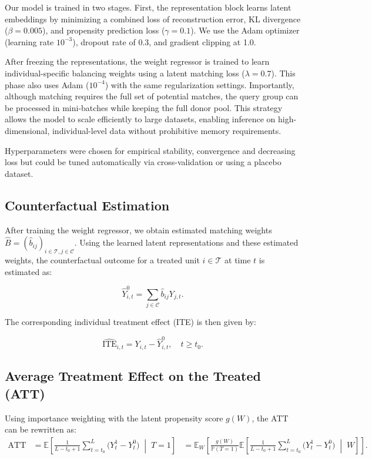 \documentclass[10pt]{article} %
\begin{document}
Our model is trained in two stages. First, the representation block learns latent embeddings by minimizing a combined loss of reconstruction error, KL divergence (\(\beta = 0.005\)), and propensity prediction loss (\(\gamma = 0.1\)). We use the Adam optimizer \cite{kingma2014adam} (learning rate \(10^{-3}\)), dropout rate of 0.3, and gradient clipping at 1.0.

After freezing the representations, the weight regressor is trained to learn individual-specific balancing weights using a latent matching loss (\(\lambda = 0.7\)). This phase also uses Adam (\(10^{-4}\)) with the same regularization settings. Importantly, although matching requires the full set
of potential matches, the query group can
be processed in mini-batches while keeping the full donor pool. This strategy allows
the model to scale efficiently to large datasets, enabling
inference on high-dimensional, individual-level data
without prohibitive memory requirements. 

Hyperparameters were chosen for empirical stability, convergence and decreasing loss but could be tuned automatically via cross-validation or using a placebo dataset.

\subsection{Counterfactual Estimation}
After training the weight regressor, we obtain estimated matching weights \(\hat B = (\hat b_{ij})_{i \in \mathcal{T},j\in \mathcal{C}}\).
Using the learned latent representations and these estimated weights, the counterfactual outcome for a treated unit \( i \in \mathcal{T} \) at time $t$ is estimated as:

\[
\hat{Y}_{i,t}^0 = \sum_{j \in \mathcal{C}} \hat{b}_{ij} Y_{j,t}.
\]

\noindent The corresponding individual treatment effect (ITE) is then given by:

\[
\hat{\text{ITE}}_{i,t}= Y_{i,t} - \hat{Y}_{i,t}^0, \quad t \geq t_0.
\]

\subsection{Average Treatment Effect on the Treated (ATT)}

Using importance weighting \citep{kloek1978bayesian} with the latent propensity score \(g(W)\), the ATT can be rewritten as:
\begin{align}
\mathrm{ATT}
&=
\mathbb{E}\!\left[
\frac{1}{L-t_0+1}
\sum_{t=t_0}^{L}
\bigl(
Y_t^1-Y_t^0
\bigr)
\;\middle|\; T=1
\right]
&=
\mathbb{E}_W\!\left[
\frac{g(W)}{\mathbb{P}(T=1)}
\mathbb{E}\!\left[
\frac{1}{L-t_0+1}
\sum_{t=t_0}^{L}
\bigl(
Y_t^1-Y_t^0
\bigr)
\;\middle|\; W
\right]
\right].
\label{eq:ATT}
\end{align}
\end{document}
